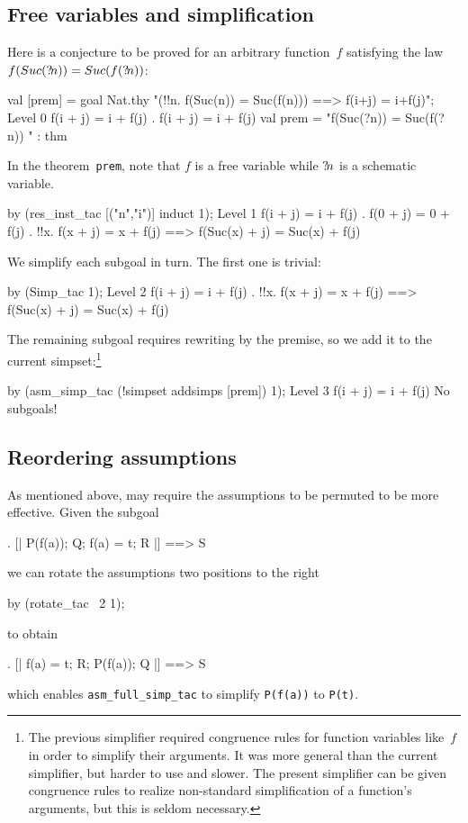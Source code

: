 \subsection{Free variables and simplification}
Here is a conjecture to be proved for an arbitrary function~$f$ satisfying
the law $f(Suc({?\!n})) = Suc(f({?\!n}))$:
\begin{ttbox}
val [prem] = goal Nat.thy
    "(!!n. f(Suc(n)) = Suc(f(n))) ==> f(i+j) = i+f(j)";
{\out Level 0}
{\out f(i + j) = i + f(j)}
{. f(i + j) = i + f(j)}
\ttbreak
{\out val prem = "f(Suc(?n)) = Suc(f(?n))}
{\out             [!!n. f(Suc(n)) = Suc(f(n))]" : thm}
\end{ttbox}
In the theorem~{\tt prem}, note that $f$ is a free variable while
${?\!n}$ is a schematic variable.
\begin{ttbox}
by (res_inst_tac [("n","i")] induct 1);
{\out Level 1}
{\out f(i + j) = i + f(j)}
{. f(0 + j) = 0 + f(j)}
{. !!x. f(x + j) = x + f(j) ==> f(Suc(x) + j) = Suc(x) + f(j)}
\end{ttbox}
We simplify each subgoal in turn.  The first one is trivial:
\begin{ttbox}
by (Simp_tac 1);
{\out Level 2}
{\out f(i + j) = i + f(j)}
{. !!x. f(x + j) = x + f(j) ==> f(Suc(x) + j) = Suc(x) + f(j)}
\end{ttbox}
The remaining subgoal requires rewriting by the premise, so we add it
to the current simpset:\footnote{The previous simplifier required
  congruence rules for function variables like~$f$ in order to
  simplify their arguments.  It was more general than the current
  simplifier, but harder to use and slower.  The present simplifier
  can be given congruence rules to realize non-standard simplification
  of a function's arguments, but this is seldom necessary.}
\begin{ttbox}
by (asm_simp_tac (!simpset addsimps [prem]) 1);
{\out Level 3}
{\out f(i + j) = i + f(j)}
{\out No subgoals!}
\end{ttbox}

\subsection{Reordering assumptions}
\label{sec:reordering-asms}

As mentioned above,  may require the assumptions
to be permuted to be more effective.  Given the subgoal
\begin{ttbox}
{. [| P(f(a)); Q; f(a) = t; R |] ==> S}
\end{ttbox}
we can rotate the assumptions two positions to the right
\begin{ttbox}
by (rotate_tac ~2 1);
\end{ttbox}
to obtain
\begin{ttbox}
{. [| f(a) = t; R; P(f(a)); Q |] ==> S}
\end{ttbox}
which enables \verb$asm_full_simp_tac$ to simplify \verb$P(f(a))$ to
\verb$P(t)$.


